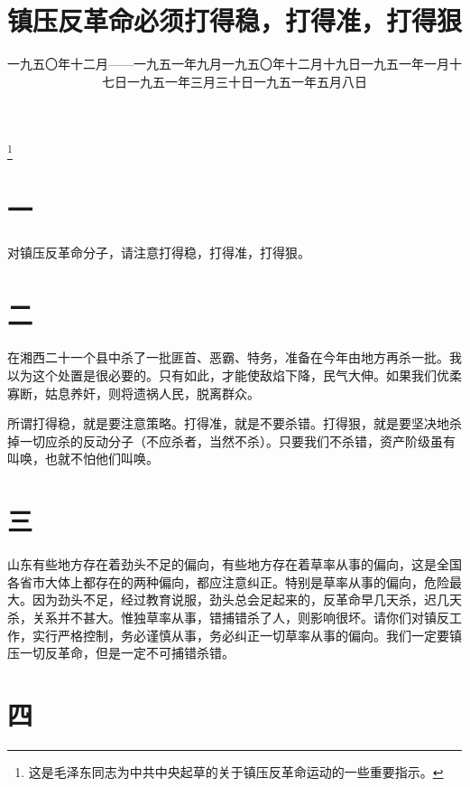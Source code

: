 
\title{镇压反革命必须打得稳，打得准，打得狠}
\date{一九五〇年十二月——一九五一年九月}
\thanks{这是毛泽东同志为中共中央起草的关于镇压反革命运动的一些重要指示。}
\maketitle


\date{一九五〇年十二月十九日}
\section*{一}

对镇压反革命分子，请注意打得稳，打得准，打得狠。

\date{一九五一年一月十七日}
\section*{二}

在湘西二十一个县中杀了一批匪首、恶霸、特务，准备在今年由地方再杀一批。我以为这个处置是很必要的。只有如此，才能使敌焰下降，民气大伸。如果我们优柔寡断，姑息养奸，则将遗祸人民，脱离群众。

所谓打得稳，就是要注意策略。打得准，就是不要杀错。打得狠，就是要坚决地杀掉一切应杀的反动分子（不应杀者，当然不杀）。只要我们不杀错，资产阶级虽有叫唤，也就不怕他们叫唤。

\date{一九五一年三月三十日}
\section*{三}

山东有些地方存在着劲头不足的偏向，有些地方存在着草率从事的偏向，这是全国各省市大体上都存在的两种偏向，都应注意纠正。特别是草率从事的偏向，危险最大。因为劲头不足，经过教育说服，劲头总会足起来的，反革命早几天杀，迟几天杀，关系并不甚大。惟独草率从事，错捕错杀了人，则影响很坏。请你们对镇反工作，实行严格控制，务必谨慎从事，务必纠正一切草率从事的偏向。我们一定要镇压一切反革命，但是一定不可捕错杀错。

\date{一九五一年五月八日}
\section*{四}

